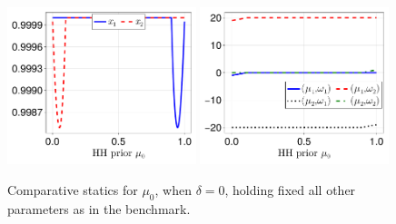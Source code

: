 \documentclass[12pt,a4paper]{article}
\begin{document}
\begin{figure}[H]
\centering
\includegraphics[width=0.49\textwidth]{figures/V11/γ=10.0-μ_0=0.5-α=1.0-θ=1.0-δ=0.0-ω_1=1.0-ω_2=-1.0/communication/fig_optimal_x_by_μ_0.pdf}
\includegraphics[width=0.49\textwidth]{figures/V11/γ=10.0-μ_0=0.5-α=1.0-θ=1.0-δ=0.0-ω_1=1.0-ω_2=-1.0/communication/fig_optimal_γ_by_μ_0.pdf}
\caption{Comparative statics for $\mu_0$, when $\delta=0$, holding fixed all other parameters as in the benchmark.}
\label{FigureA1}
\end{figure}
\end{document}
